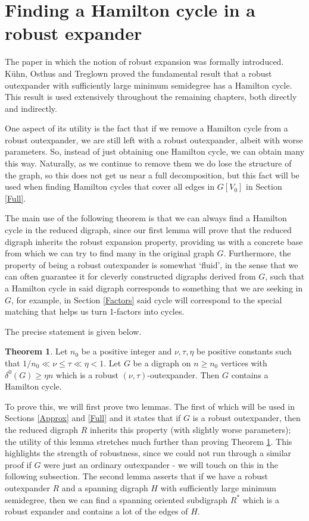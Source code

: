 \documentclass[10pt,letterpaper, reqno]{amsart}
\theoremstyle{definition}
\newtheorem{thm}{Theorem}[section]
\numberwithin{equation}{section}
\begin{document}
\section{Finding a Hamilton cycle in a robust expander}\label{HamCyc}
\noindent The paper \cite{DegreeSequencesInDigraphs} in which the notion of robust expansion was formally introduced. K\"{u}hn, Osthus and Treglown proved the fundamental result that a robust outexpander with sufficiently large minimum semidegree has a Hamilton cycle. This result is used extensively throughout the remaining chapters, both directly and indirectly. 

One aspect of its utility is the fact that if we remove a Hamilton cycle from a robust outexpander, we are still left with a robust outexpander, albeit with worse parameters. So, instead of just obtaining one Hamilton cycle, we can obtain many this way. Naturally, as we continue to remove them we do lose the structure of the graph, so this does not get us near a full decomposition, but this fact will be used when finding Hamilton cycles that cover all edges in $G[V_0]$ in Section \ref{Full}.

The main use of the following theorem is that we can always find a Hamilton cycle in the reduced digraph, since our first lemma will prove that the reduced digraph inherits the robust expansion property, providing us with a concrete base from which we can try to find many in the original graph $G$. Furthermore, the property of being a robust outexpander is somewhat `fluid', in the sense that we can often guarantee it for cleverly constructed digraphs derived from $G$, such that a Hamilton cycle in said digraph corresponds to something that we are seeking in $G$, for example, in Section \ref{Factors} said cycle will correspond to the special matching that helps us turn 1-factors into cycles.

The precise statement is given below. 

\begin{thm}\label{HamCycleIfRE}
	Let $n_0$ be a positive integer and $\nu, \tau, \eta$ be positive constants such that $1/n_0 \ll \nu \leq \tau \ll \eta <1$. Let $G$ be a digraph on $n \geq n_0$ vertices with $\delta^0(G) \geq \eta n$ which is a robust $(\nu, \tau)$-outexpander. Then $G$ contains a Hamilton cycle. 
\end{thm}

To prove this, we will first prove two lemmas. The first of which will be used in Sections \ref{Approx} and \ref{Full} and it states that if $G$ is a robust outexpander, then the reduced digraph $R$ inherits this property (with slightly worse parameters); the utility of this lemma stretches much further than proving Theorem \ref{HamCycleIfRE}. This highlights the strength of robustness, since we could not run through a similar proof if $G$ were just an ordinary outexpander - we will touch on this in the following subsection. The second lemma asserts that if we have a robust outexpander $R$ and a spanning digraph $H$ with sufficiently large minimum semidegree, then we can find a spanning oriented subdigraph $R^*$ which is a robust expander and contains a lot of the edges of $H$. 
\end{document}

